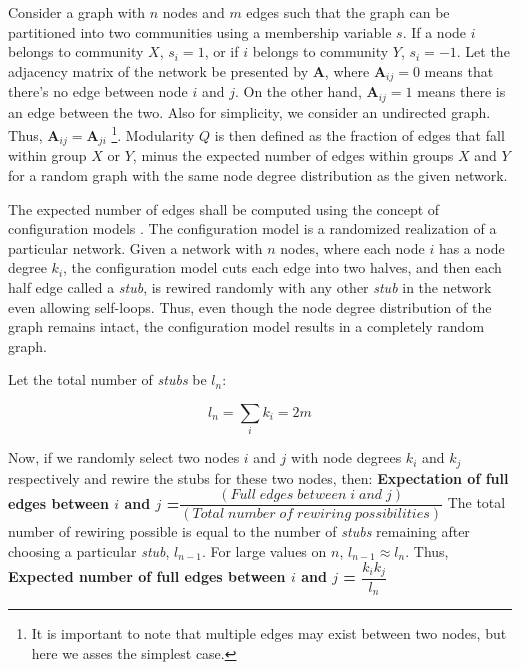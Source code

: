 Consider a graph with $n$ nodes and $m$ edges such that the graph can be partitioned into two communities using a membership variable $s$. If a node $i$ belongs to community $X$, $s_i = 1$, or if $i$ belongs to community $Y$, $s_i = -1$. Let the adjacency matrix of the network be presented by $\textbf{A}$, where $\textbf{A}_{ij} = 0$ means that there's no edge between node $i$ and $j$. On the other hand, $\textbf{A}_{ij} = 1$ means there is an edge between the two. Also for simplicity, we consider an undirected graph. Thus, $\textbf{A}_{ij} = \textbf{A}_{ji}$ \footnote{It is important to note that multiple edges may exist between two nodes, but here we asses the simplest case.}. Modularity $Q$ is then defined as the fraction of  edges that fall within group $X$ or $Y$, minus the expected number of edges within groups $X$ and $Y$ for a random graph with the same node degree distribution as the given network.

The expected number of edges shall be computed using the concept of configuration models \cite{ref-16}. The configuration model is a randomized realization of a particular network. Given a network with $n$ nodes, where each node $i$ has a node degree $k_i$, the configuration model cuts each edge into two halves, and then each half edge called a \textit{stub}, is rewired randomly with any other \textit{stub} in the network even allowing self-loops. Thus, even though the node degree distribution of the graph remains intact, the configuration model results in a completely random graph.

Let the total number of \textit{stubs} be $l_n$:

\begin{equation}
l_n = \sum\limits_i k_i = 2m
\end{equation}

Now, if we randomly select two nodes $i$ and $j$ with node degrees $k_i$ and $k_j$ respectively and rewire the stubs for these two nodes, then:
\newline\newline
\textbf{Expectation of full edges between $i$ and $j$ =$\dfrac{(Full \; edges \; between \; i \; and \; j )}{(Total \; number \; of \; rewiring \; possibilities)}$} 
\newline\newline
The total number of rewiring possible is equal to the number of \textit{stubs} remaining after choosing a particular \textit{stub}, $l_{n-1}$. For large values on $n$, $l_{n-1} \approx l_n$. Thus,
\newline\newline
\textbf{Expected number of full edges between $i$ and $j$ = $\dfrac{k_i k_j}{l_n}$}
\newline\newline

